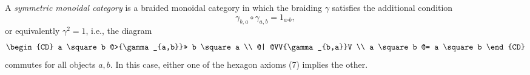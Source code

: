 A \emph{symmetric monoidal category} is a braided monoidal category in which the braiding $\gamma$ satisfies the additional condition
$$\gamma_{b,a} \circ \gamma_{a,b} = 1_{a \square b},$$
or equivalently $\gamma^2 = 1$, i.e., the diagram
\[
\begin{CD}
a \square b @>{\gamma_{a,b}}>> b \square a \\
@| @VV{\gamma_{b,a}}V \\
a \square b @= a \square b
\end{CD}
\]
commutes for all objects $a, b$. In this case, either one of the hexagon axioms (7) implies the other.
